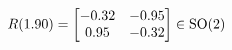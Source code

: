 \documentclass[preview]{standalone}
\begin{document}
\begin{align*}
\special{dvisvgm:raw <g id='unique000'>}R(1.90) = \begin{bmatrix} -0.32 & -0.95 \\ 0.95 & -0.32 \end{bmatrix} \in \text{SO}(2)\special{dvisvgm:raw </g>}
\end{align*}
\end{document}
